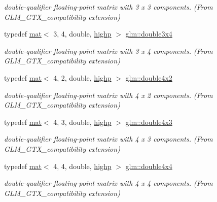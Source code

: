 \begin{DoxyCompactItemize}
\begin{DoxyCompactList}\small\item\em double-\/qualifier floating-\/point matrix with 3 x 3 components. (From G\+L\+M\+\_\+\+G\+T\+X\+\_\+compatibility extension) \end{DoxyCompactList}\item 
typedef \mbox{\hyperlink{structglm_1_1mat}{mat}}$<$ 3, 4, double, \mbox{\hyperlink{namespaceglm_a36ed105b07c7746804d7fdc7cc90ff25ac6f7eab42eacbb10d59a58e95e362074}{highp}} $>$ \mbox{\hyperlink{group__gtx__compatibility_gad93d79598c615c80626e270f4357d189}{glm\+::double3x4}}
\begin{DoxyCompactList}\small\item\em double-\/qualifier floating-\/point matrix with 3 x 4 components. (From G\+L\+M\+\_\+\+G\+T\+X\+\_\+compatibility extension) \end{DoxyCompactList}\item 
typedef \mbox{\hyperlink{structglm_1_1mat}{mat}}$<$ 4, 2, double, \mbox{\hyperlink{namespaceglm_a36ed105b07c7746804d7fdc7cc90ff25ac6f7eab42eacbb10d59a58e95e362074}{highp}} $>$ \mbox{\hyperlink{group__gtx__compatibility_ga5ca0eb6627cf8829e3cab6694d1a6452}{glm\+::double4x2}}
\begin{DoxyCompactList}\small\item\em double-\/qualifier floating-\/point matrix with 4 x 2 components. (From G\+L\+M\+\_\+\+G\+T\+X\+\_\+compatibility extension) \end{DoxyCompactList}\item 
typedef \mbox{\hyperlink{structglm_1_1mat}{mat}}$<$ 4, 3, double, \mbox{\hyperlink{namespaceglm_a36ed105b07c7746804d7fdc7cc90ff25ac6f7eab42eacbb10d59a58e95e362074}{highp}} $>$ \mbox{\hyperlink{group__gtx__compatibility_ga2f73c8a3c9cd5198695163229f0ce754}{glm\+::double4x3}}
\begin{DoxyCompactList}\small\item\em double-\/qualifier floating-\/point matrix with 4 x 3 components. (From G\+L\+M\+\_\+\+G\+T\+X\+\_\+compatibility extension) \end{DoxyCompactList}\item 
typedef \mbox{\hyperlink{structglm_1_1mat}{mat}}$<$ 4, 4, double, \mbox{\hyperlink{namespaceglm_a36ed105b07c7746804d7fdc7cc90ff25ac6f7eab42eacbb10d59a58e95e362074}{highp}} $>$ \mbox{\hyperlink{group__gtx__compatibility_gaa0d75f4adb5cb1af3b1ba09720954306}{glm\+::double4x4}}
\begin{DoxyCompactList}\small\item\em double-\/qualifier floating-\/point matrix with 4 x 4 components. (From G\+L\+M\+\_\+\+G\+T\+X\+\_\+compatibility extension) \end{DoxyCompactList}\end{DoxyCompactItemize}
